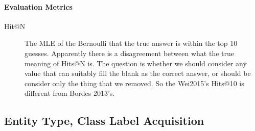 \documentclass{article}
\begin{document}
\paragraph{Evaluation Metrics}
\begin{description}
\item[Hit@N] The MLE of the Bernoulli that the true answer is within the top 10 guesses.
  Apparently there is a disagreement between what the true meaning of Hits@N is.
  The question is whether we should consider any value that can suitably fill the blank
  as the correct answer, or should be consider only the thing that we removed. So the
  Wei2015's Hits@10 is different from Bordes 2013's.
\end{description}

\pagebreak
\subsection{Entity Type, Class Label Acquisition}
\end{document}

